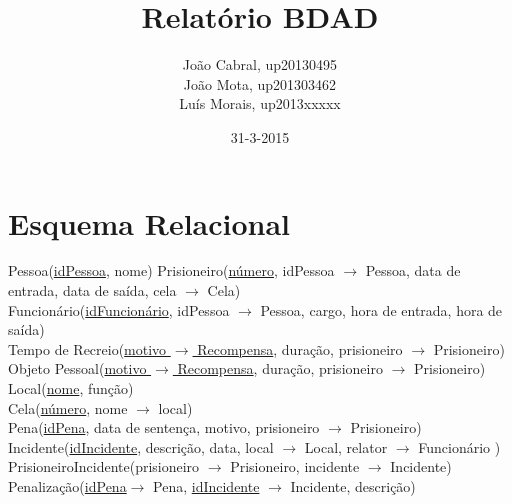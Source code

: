 \documentclass{article}
\title{Relatório BDAD}
\date{31-3-2015}
\author{João Cabral, up20130495\\
	   João Mota, up201303462\\
	   Luís Morais, up2013xxxxx}
\begin{document}
\maketitle
{}
\newpage
{}

\section{Esquema Relacional}
Pessoa(\underline{idPessoa}, nome)
Prisioneiro(\underline{número}, idPessoa $\rightarrow$ Pessoa, data de entrada, data de saída, cela $\rightarrow$ Cela)\\
Funcionário(\underline{idFuncionário}, idPessoa $\rightarrow$ Pessoa, cargo, hora de entrada, hora de saída)\\
Tempo de Recreio(\underline{motivo $\rightarrow$ Recompensa}, duração, prisioneiro $\rightarrow$ Prisioneiro)\\
Objeto Pessoal(\underline{motivo $\rightarrow$ Recompensa}, duração, prisioneiro $\rightarrow$ Prisioneiro)\\
Local(\underline{nome}, função)\\
Cela(\underline{número}, nome $\rightarrow$ local)\\
Pena(\underline{idPena}, data de sentença, motivo, prisioneiro $\rightarrow$ Prisioneiro)\\
Incidente(\underline{idIncidente}, descrição, data, local $\rightarrow$ Local, relator $\rightarrow$ Funcionário )\\
PrisioneiroIncidente(prisioneiro $\rightarrow$ Prisioneiro, incidente $\rightarrow$ Incidente)\\
Penalização(\underline{idPena}$\rightarrow$ Pena, \underline{idIncidente} $\rightarrow$ Incidente, descrição)

\end{document}
